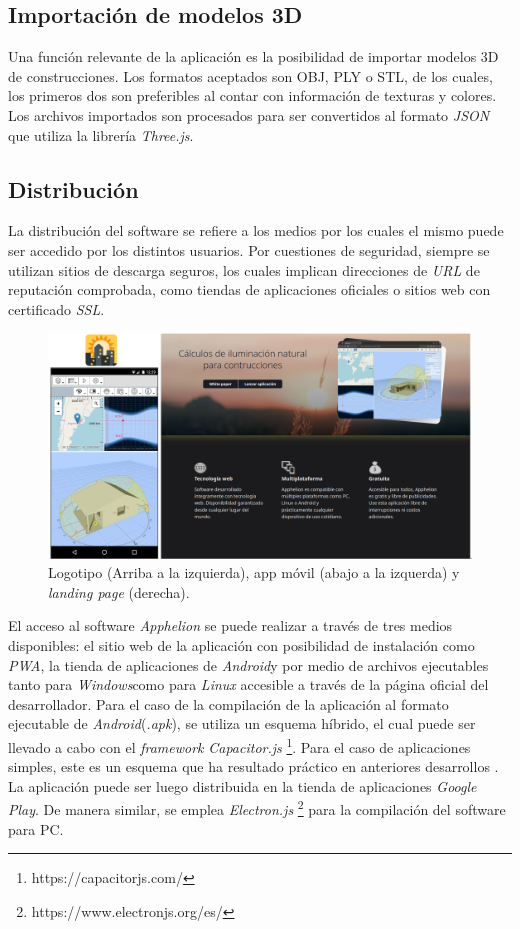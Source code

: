 \documentclass[a4paper]{article}
\begin{document}
\subsection{Importación de modelos 3D}
Una función relevante de la aplicación es la posibilidad de importar modelos 3D de construcciones. Los formatos aceptados son OBJ, PLY o STL, de los cuales, los primeros dos son preferibles al contar con información de texturas y colores. Los archivos importados son procesados para ser convertidos al formato \textit{JSON} que utiliza la librería \textit{Three.js}.

\subsection{Distribución}
La distribución del software se refiere a los medios por los cuales el mismo puede ser accedido por los distintos usuarios. Por cuestiones de seguridad, siempre se utilizan sitios de descarga seguros, los cuales implican direcciones de \textit{URL} de reputación comprobada, como tiendas de aplicaciones oficiales o sitios web con certificado \textit{SSL}. 

\begin{figure}[ht]
    \centering
    \includegraphics[width=\textwidth]{images/landing.png}
    \caption{Logotipo (Arriba a la izquierda), app móvil (abajo a la izquerda) y \textit{landing page} (derecha).}
    \label{fig:landing}
\end{figure}

El acceso al software \textit{Apphelion} se puede realizar a través de tres medios disponibles: el sitio web de la aplicación con posibilidad de instalación como \textit{PWA}, la tienda de aplicaciones de \textit{Android}\textregistered y por medio de archivos ejecutables tanto para \textit{Windows}\textregistered como para \textit{Linux} accesible a través de la página oficial del desarrollador. Para el caso de la compilación de la aplicación al formato ejecutable de \textit{Android}\textregistered (\textit{.apk}), se utiliza un esquema híbrido, el cual puede ser llevado a cabo con el \textit{framework} \textit{Capacitor.js} \footnote{https://capacitorjs.com/}. Para el caso de aplicaciones simples, este es un esquema que ha resultado práctico en anteriores desarrollos \cite{ref_criollo, ref_campero, ref_agrario}. La aplicación puede ser luego distribuida en la tienda de aplicaciones \textit{Google Play}\textregistered. De manera similar, se emplea \textit{Electron.js} \footnote{https://www.electronjs.org/es/} para la compilación del software para PC.
\end{document}
